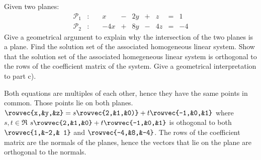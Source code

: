 
\begin{Exercise}[
name={},
title={}, 
difficulty=0,
origin={\cite{YL}}]
Given two planes:
\[
\begin{array}{lllrrrrrrrrrrr}
\mathcal{P}_1 & : & \; &x&-&2y&+&z & = &1\\
\mathcal{P}_2 & : & \; &-4x&+&8y&-&4z & =&-4
\end{array}
\]
\Question Give a geometrical argument to explain why the intersection of the two planes is a plane.
\Question Find the solution set of the associated homogeneous linear system.
\Question Show that the solution set of the associated homegeneous linear system is orthogonal to the rows of the coefficient matrix of the system.
\Question Give a geometrical interpretation to part c).
\end{Exercise}

\begin{Answer}
\Question Both equations are multiples of each other, hence they have the same points in common.  Those points lie on both planes.
\Question $\rowvec{x,&y,&z}=s\rowvec{2,&1,&0)}+t\rowvec{-1,&0,&1}$ where $s,t\in\Re$
\Question $s\rowvec{2,&1,&0}+t\rowvec{-1,&0,&1}$ is othogonal to both $\rowvec{1,&-2,& 1}$ and $\rowvec{-4,&8,&-4}$.
\Question The rows of the coefficient matrix are the normals of the planes, hence the vectors that lie on the plane are orthogonal to the normals.
\end{Answer}
